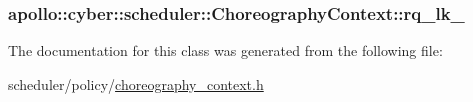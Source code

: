 \hypertarget{classapollo_1_1cyber_1_1scheduler_1_1ChoreographyContext_a758b50ddb206c4792e855afaa15f6f2c}{
\subsubsection[{rq\-\_\-lk\-\_\-}]{ apollo\-::cyber\-::scheduler\-::\-Choreography\-Context\-::rq\-\_\-lk\-\_\-\hspace{0.3cm}{\ttfamily [private]}}}\label{classapollo_1_1cyber_1_1scheduler_1_1ChoreographyContext_a758b50ddb206c4792e855afaa15f6f2c}


The documentation for this class was generated from the following file\-:\begin{DoxyCompactItemize}
\item 
scheduler/policy/\hyperlink{choreography__context_8h}{choreography\-\_\-context.\-h}\end{DoxyCompactItemize}
